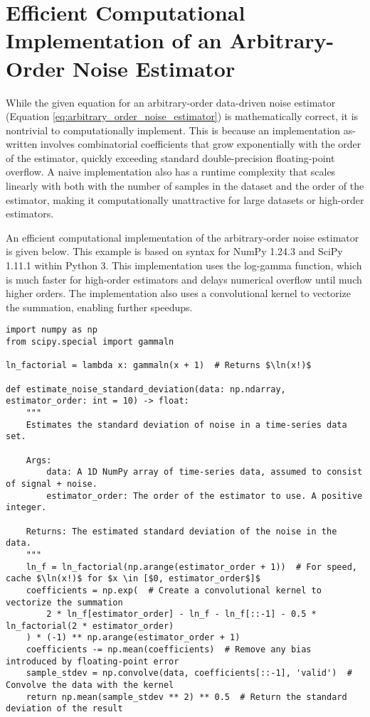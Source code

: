 \section{Efficient Computational Implementation of an Arbitrary-Order Noise Estimator}
\label{sec:estimator_code_example}

While the given equation for an arbitrary-order data-driven noise estimator (Equation \ref{eq:arbitrary_order_noise_estimator}) is mathematically correct, it is nontrivial to computationally implement. This is because an implementation as-written involves combinatorial coefficients that grow exponentially with the order of the estimator, quickly exceeding standard double-precision floating-point overflow. A naive implementation also has a runtime complexity that scales linearly with both with the number of samples in the dataset and the order of the estimator, making it computationally unattractive for large datasets or high-order estimators.

An efficient computational implementation of the arbitrary-order noise estimator is given below. This example is based on syntax for NumPy 1.24.3 and SciPy 1.11.1 within Python 3. This implementation uses the log-gamma function, which is much faster for high-order estimators and delays numerical overflow until much higher orders. The implementation also uses a convolutional kernel to vectorize the summation, enabling further speedups.

\begin{listing}[H]
    \begin{verbatim}
import numpy as np
from scipy.special import gammaln

ln_factorial = lambda x: gammaln(x + 1)  # Returns $\ln(x!)$

def estimate_noise_standard_deviation(data: np.ndarray, estimator_order: int = 10) -> float:
    """
    Estimates the standard deviation of noise in a time-series data set.

    Args:
        data: A 1D NumPy array of time-series data, assumed to consist of signal + noise.
        estimator_order: The order of the estimator to use. A positive integer.

    Returns: The estimated standard deviation of the noise in the data.
    """
    ln_f = ln_factorial(np.arange(estimator_order + 1))  # For speed, cache $\ln(x!)$ for $x \in [$0, estimator_order$]$
    coefficients = np.exp(  # Create a convolutional kernel to vectorize the summation
        2 * ln_f[estimator_order] - ln_f - ln_f[::-1] - 0.5 * ln_factorial(2 * estimator_order)
    ) * (-1) ** np.arange(estimator_order + 1)
    coefficients -= np.mean(coefficients)  # Remove any bias introduced by floating-point error
    sample_stdev = np.convolve(data, coefficients[::-1], 'valid')  # Convolve the data with the kernel
    return np.mean(sample_stdev ** 2) ** 0.5  # Return the standard deviation of the result


    \end{verbatim}
    \caption{Example efficient implementation of the arbitrary-order noise estimator using NumPy/SciPy in Python 3.}
    \label{listing:efficient_arbitrary_order_noise_estimator}
\end{listing}
